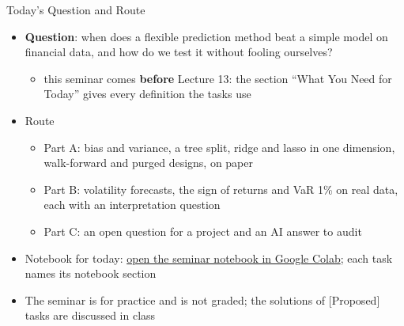 \begin{frame}{Today's Question and Route}
\itemsize{\small}
\begin{itemize}
    \item \textbf{Question}: when does a flexible prediction method beat a simple model on financial data, and how do we test it without fooling ourselves?
    \begin{itemize}
        \item this seminar comes \textbf{before} Lecture 13: the section ``What You Need for Today'' gives every definition the tasks use
    \end{itemize}
    \item Route
    \begin{itemize}
        \item Part A: bias and variance, a tree split, ridge and lasso in one dimension, walk-forward and purged designs, on paper
        \item Part B: volatility forecasts, the sign of returns and VaR 1\% on real data, each with an interpretation question
        \item Part C: an open question for a project and an AI answer to audit
    \end{itemize}
    \item Notebook for today: \href{\nb}{open the seminar notebook in Google Colab}; each task names its notebook section
    \item The seminar is for practice and is not graded; the solutions of [Proposed] tasks are discussed in class
\end{itemize}
\end{frame}

